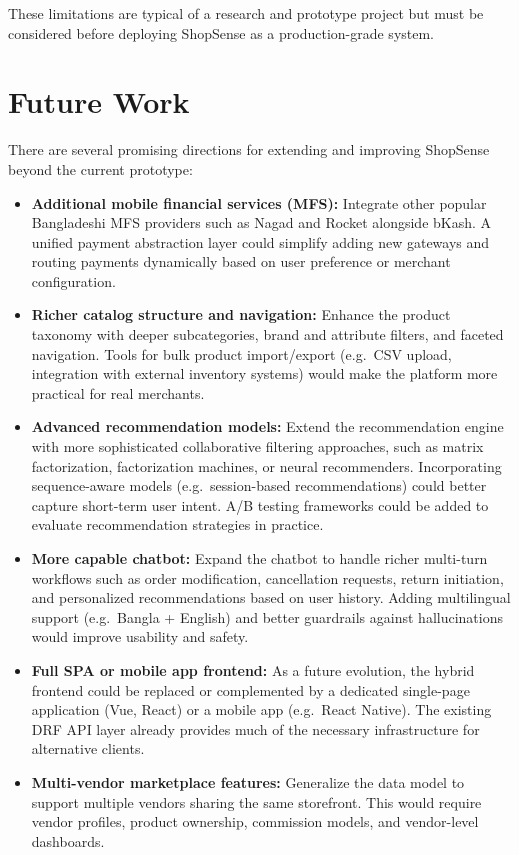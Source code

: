 These limitations are typical of a research and prototype project but must be considered before deploying ShopSense as a production-grade system.

\section{Future Work}

There are several promising directions for extending and improving ShopSense beyond the current prototype:

\begin{itemize}
  \item \textbf{Additional mobile financial services (MFS):} Integrate other popular Bangladeshi MFS providers such as Nagad and Rocket alongside bKash. A unified payment abstraction layer could simplify adding new gateways and routing payments dynamically based on user preference or merchant configuration.
  \item \textbf{Richer catalog structure and navigation:} Enhance the product taxonomy with deeper subcategories, brand and attribute filters, and faceted navigation. Tools for bulk product import/export (e.g.\ CSV upload, integration with external inventory systems) would make the platform more practical for real merchants.
  \item \textbf{Advanced recommendation models:} Extend the recommendation engine with more sophisticated collaborative filtering approaches, such as matrix factorization, factorization machines, or neural recommenders. Incorporating sequence-aware models (e.g.\ session-based recommendations) could better capture short-term user intent. A/B testing frameworks could be added to evaluate recommendation strategies in practice.
  \item \textbf{More capable chatbot:} Expand the chatbot to handle richer multi-turn workflows such as order modification, cancellation requests, return initiation, and personalized recommendations based on user history. Adding multilingual support (e.g.\ Bangla + English) and better guardrails against hallucinations would improve usability and safety.
  \item \textbf{Full SPA or mobile app frontend:} As a future evolution, the hybrid frontend could be replaced or complemented by a dedicated single-page application (Vue, React) or a mobile app (e.g.\ React Native). The existing DRF API layer already provides much of the necessary infrastructure for alternative clients.
  \item \textbf{Multi-vendor marketplace features:} Generalize the data model to support multiple vendors sharing the same storefront. This would require vendor profiles, product ownership, commission models, and vendor-level dashboards.

\end{itemize}
